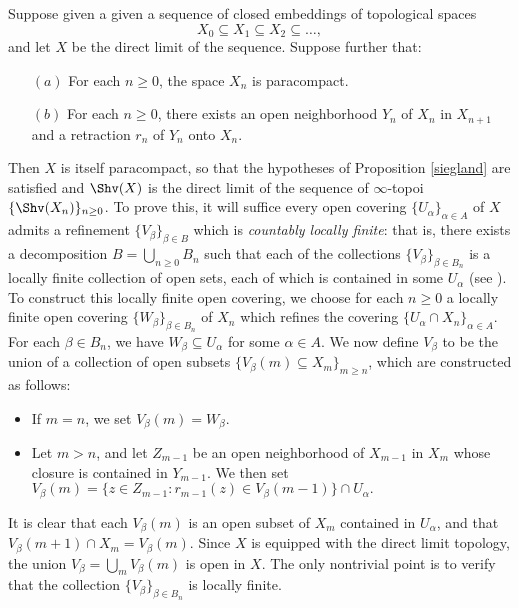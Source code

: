 \begin{remark}
Suppose given a given a sequence of closed embeddings of topological spaces
$$ X_0 \subseteq X_1 \subseteq X_2 \subseteq \ldots,$$
and let $X$ be the direct limit of the sequence. Suppose further that:
\begin{itemize}
\item[$(a)$] For each $n \geq 0$, the space $X_n$ is paracompact.
\item[$(b)$] For each $n \geq 0$, there exists an open neighborhood
$Y_n$ of $X_n$ in $X_{n+1}$ and a retraction $r_n$ of $Y_{n}$ onto $X_n$.
\end{itemize}
Then $X$ is itself paracompact, so that the hypotheses of Proposition \ref{siegland} are satisfied and $\Shv(X)$ is the direct limit of the sequence of $\infty$-topoi $\{ \Shv(X_n) \}_{n \geq 0}$. To prove this, it will suffice every open covering $\{ U_{\alpha} \}_{\alpha \in A}$ of $X$ admits a refinement
$\{ V_{\beta} \}_{\beta \in B}$ which is {\em countably locally finite}: that is, there exists a decomposition
$B = \bigcup_{n \geq 0} B_{n}$ such that each of the collections
$\{ V_{\beta} \}_{\beta \in B_n }$ is a locally finite collection of open sets, each of which is contained in some $U_{\alpha}$ (see \cite{munkres}). To construct this locally finite open covering, we choose for
each $n \geq 0$ a locally finite open covering $\{ W_{\beta} \}_{\beta \in B_n}$ of $X_n$ which refines the covering $\{ U_{\alpha} \cap X_n \}_{\alpha \in A}$. For each $\beta \in B_n$, we have
$W_{\beta} \subseteq U_{\alpha}$ for some $\alpha \in A$. We now define
$V_{\beta}$ to be the union of a collection of open subsets 
$\{ V_{\beta}(m) \subseteq X_m \}_{m \geq n}$, which are constructed as follows:
\begin{itemize}
\item If $m = n$, we set $V_{\beta}(m) = W_{\beta}$.
\item Let $m > n$, and let $Z_{m-1}$ be an open neighborhood of $X_{m-1}$ in
$X_m$ whose closure is contained in $Y_{m-1}$. We then set
$V_{\beta}(m)= \{ z \in Z_{m-1}: r_{m-1}(z) \in V_{\beta}(m-1) \} \cap U_{\alpha}.$ 
\end{itemize}
It is clear that each $V_{\beta}(m)$ is an open subset of $X_m$ contained in $U_{\alpha}$, and that
$V_{\beta}(m+1) \cap X_m = V_{\beta}(m)$. Since $X$ is equipped with the direct limit topology,
the union $V_{\beta} = \bigcup_{m} V_{\beta}(m)$ is open in $X$. The only nontrivial point is to
verify that the collection $\{ V_{\beta} \}_{\beta \in B_n}$ is locally finite. 


\end{remark}
